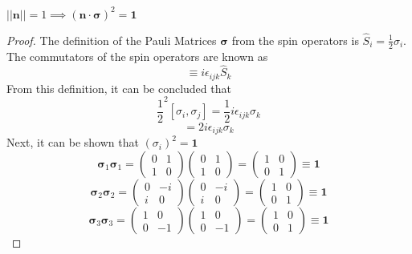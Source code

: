 \begin{sol}
\begin{lemma}
$||\mathbf{n}||=1\implies(\mathbf{n}\cdot\mathbf{\sigma})^2=\mathbf{1}
$
\end{lemma}
\begin{proof} 
The definition of the Pauli Matrices $\mathbf{\sigma}$ from the spin operators is $\hat{S}_i=\frac{1}{2}\sigma_i$. The commutators of the spin operators are known as
\begin{equation}
	[\hat{S}_i,\hat{S}_j]\equiv i\epsilon_{ijk}\hat{S}_k
\end{equation} 
From this definition, it can be concluded that
\begin{equation}
	\frac{1}{2}^2[\sigma_i,\sigma_j]=\frac{1}{2}i\epsilon_{ijk}\sigma_k
\end{equation}
\begin{equation}
	[\sigma_i,\sigma_j]=2i\epsilon_{ijk}\sigma_k
\end{equation}
Next, it can be shown that $(\sigma_i)^2=\mathbf{1}$ 
\begin{equation}
	\mathbf{\sigma}_1\mathbf{\sigma}_1=\begin{pmatrix}0&1\\1&0\end{pmatrix}\begin{pmatrix}0&1\\1&0\end{pmatrix} =\begin{pmatrix}1 &0\\0&1\end{pmatrix}\equiv\mathbf{1}
\end{equation} \begin{equation}
	\mathbf{\sigma}_2\mathbf{\sigma}_2=\begin{pmatrix}0&-i\\i&0\end{pmatrix}\begin{pmatrix}0&-i\\i&0\end{pmatrix} =\begin{pmatrix}1 &0\\0&1\end{pmatrix}\equiv\mathbf{1}
\end{equation} \begin{equation}
	\mathbf{\sigma}_3\mathbf{\sigma}_3=\begin{pmatrix}1&0\\0&-1\end{pmatrix}\begin{pmatrix}1&0\\0&-1\end{pmatrix} =\begin{pmatrix}1 &0\\0&1\end{pmatrix}\equiv\mathbf{1}

\end{equation}
\end{proof}
\end{sol}
